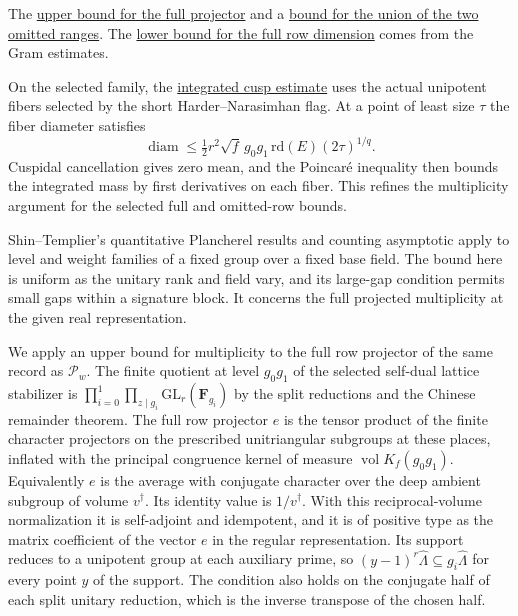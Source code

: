 {The \hyperlink{proof.one-sided-row-count}{upper bound for the full
projector} and a \hyperlink{proof.common-deep-row-cut}{bound for the
union of the two omitted ranges}. The
\hyperlink{proof.full-moment-dimension}{lower bound for the full
row dimension} comes from the Gram estimates.}

On the selected family, the
\hyperlink{proof.row-cusp-poincare}{integrated cusp estimate}
uses the actual unipotent fibers selected by the short
Harder--Narasimhan flag. At a point of least size \(\tau\) the
fiber diameter satisfies
\[
 \operatorname{diam}\le
 \tfrac12 r^2\sqrt f\,g_0g_1\,\mathrm{rd}(E)(2\tau)^{1/q}.
\]
Cuspidal cancellation gives zero mean, and the Poincar\'e inequality
then bounds the integrated mass by first derivatives on each fiber.
This refines the multiplicity argument for the selected full and
omitted-row bounds.

Shin--Templier's quantitative Plancherel results and counting
asymptotic apply to level and weight families of a fixed group over
a fixed base field. \cite[Theorems~9.16 and~9.19 and Corollary~9.25]{tr3shin-templier}
The bound here is uniform as the unitary rank and field vary,
and its large-gap condition permits small gaps within a signature
block. It concerns the full projected multiplicity at the given
real representation.

\leavevmode{}%
We apply an upper bound for multiplicity to the full row projector of the
same record as \(\mathcal P_w\). The finite quotient at level
\(g_0g_1\) of the selected self-dual lattice stabilizer is
\(\prod_{i=0}^1\prod_{z\mid g_i}\mathrm{GL}_r(\mathbf F_{g_i})\)
by the split reductions and the Chinese remainder theorem.
The full row projector \(e\) is the tensor product of the finite
character projectors on the prescribed unitriangular subgroups at
these places, inflated with the principal congruence kernel of
measure \(\operatorname{vol}K_f(g_0g_1)\).
Equivalently \(e\) is the average with conjugate character over the
deep ambient subgroup of volume \(v^\dagger\). Its identity value is
\(1/v^\dagger\). With this reciprocal-volume normalization it is
self-adjoint and idempotent, and it is of positive type as the
matrix coefficient of the vector \(e\) in the regular
representation. Its support reduces to a unipotent group at each
auxiliary prime, so \((y-1)^r\widehat{\Lambda}\subseteq
g_i\widehat{\Lambda}\) for every point \(y\) of the support.
The condition also holds on the conjugate half of each split
unitary reduction, which is the inverse transpose of the chosen half.

